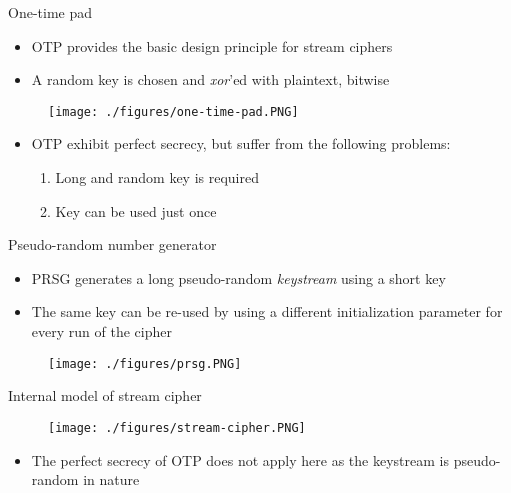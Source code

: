\documentclass{beamer}
\begin{document}
\begin{frame}{One-time pad}
  \begin{itemize}
  \item OTP provides the basic design principle for stream ciphers
  \item A random key is chosen and \textit{xor}'ed with plaintext, bitwise
  \end{itemize}
  
  \begin{figure}[htp]
	\centering
	\texttt{[image: ./figures/one-time-pad.PNG]}
	\end{figure}
	
	\begin{itemize}
		\item OTP exhibit perfect secrecy, but suffer from the following problems:
  	\begin{enumerate}
  		\item Long and random key is required
  		\item Key can be used just once
  	\end{enumerate}
  \end{itemize}
\end{frame}


\begin{frame}{Pseudo-random number generator}
	
	
	\begin{itemize}
		\item PRSG generates a long pseudo-random \textit{keystream} using a short key
		\item The same key can be re-used by using a different initialization parameter for every run of the cipher
	\end{itemize}
	
  \begin{figure}[htp]
	\centering
	\texttt{[image: ./figures/prsg.PNG]}
	\end{figure}

\end{frame}

\begin{frame}{Internal model of stream cipher}

  \begin{figure}[htp]
	\centering
	\texttt{[image: ./figures/stream-cipher.PNG]}
	\end{figure}

	\begin{itemize}
		\item The perfect secrecy of OTP does not apply here as the keystream is pseudo-random in nature
	\end{itemize}
\end{frame}
\end{document}
